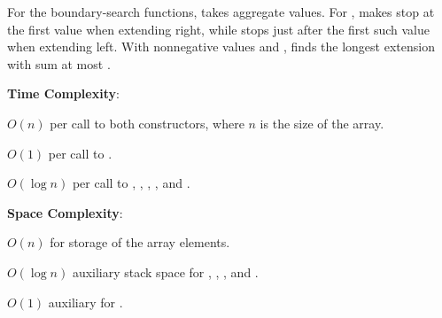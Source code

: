 For the boundary-search functions,  takes aggregate  values. For ,  makes  stop at the first value  when extending right, while  stops just after the first such value when extending left. With nonnegative values and ,  finds the longest extension with sum at most .

\textbf{Time Complexity}:
\begin{compactitem}
  \item $O(n)$ per call to both constructors, where $n$ is the size of the array.
  \item $O(1)$ per call to .
  \item $O(\log n)$ per call to , , , , and .
\end{compactitem}

\textbf{Space Complexity}:
\begin{compactitem}
  \item $O(n)$ for storage of the array elements.
  \item $O(\log n)$ auxiliary stack space for , , , and .
  \item $O(1)$ auxiliary for .
\end{compactitem}

